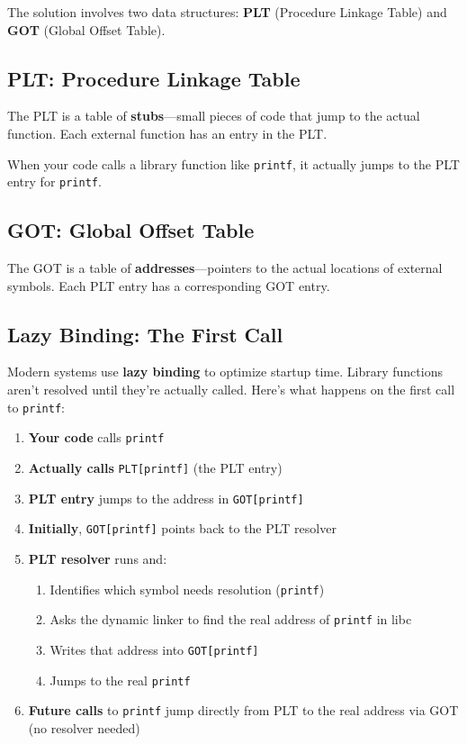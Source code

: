 The solution involves two data structures: \textbf{PLT} (Procedure Linkage Table) and \textbf{GOT} (Global Offset Table).

\subsection{PLT: Procedure Linkage Table}

The PLT is a table of \textbf{stubs}—small pieces of code that jump to the actual function. Each external function has an entry in the PLT.

When your code calls a library function like \texttt{printf}, it actually jumps to the PLT entry for \texttt{printf}.

\subsection{GOT: Global Offset Table}

The GOT is a table of \textbf{addresses}—pointers to the actual locations of external symbols. Each PLT entry has a corresponding GOT entry.

\subsection{Lazy Binding: The First Call}

Modern systems use \textbf{lazy binding} to optimize startup time. Library functions aren't resolved until they're actually called. Here's what happens on the first call to \texttt{printf}:

\begin{enumerate}
    \item \textbf{Your code} calls \texttt{printf}
    \item \textbf{Actually calls} \texttt{PLT[printf]} (the PLT entry)
    \item \textbf{PLT entry} jumps to the address in \texttt{GOT[printf]}
    \item \textbf{Initially}, \texttt{GOT[printf]} points back to the PLT resolver
    \item \textbf{PLT resolver} runs and:
    \begin{enumerate}
        \item Identifies which symbol needs resolution (\texttt{printf})
        \item Asks the dynamic linker to find the real address of \texttt{printf} in libc
        \item Writes that address into \texttt{GOT[printf]}
        \item Jumps to the real \texttt{printf}
    \end{enumerate}
    \item \textbf{Future calls} to \texttt{printf} jump directly from PLT to the real address via GOT (no resolver needed)
\end{enumerate}

